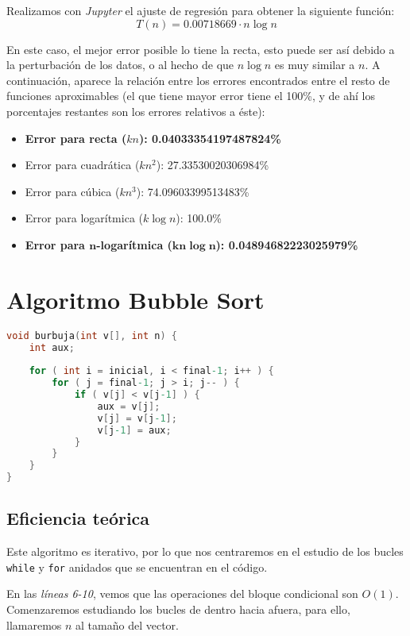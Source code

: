 \documentclass[10pt, a4paper]{article}
\theoremstyle{theorem-style}
\theoremstyle{theorem-style}
\theoremstyle{definition-style}
\theoremstyle{remark-style}
\theoremstyle{example-style}
\theoremstyle{definition-style}
\theoremstyle{remark-style}
\begin{document}
Realizamos con \emph{Jupyter} el ajuste de regresión para obtener la siguiente función:
$$T(n)=0.00718669\cdot n \log n$$

En este caso, el mejor error posible lo tiene la recta, esto puede ser así debido a la perturbación de los datos, o al hecho de que $n\log n$ es muy similar a $n$. A continuación, aparece la relación entre los errores encontrados entre el resto de funciones aproximables (el que tiene mayor error tiene el 100\%, y de ahí los porcentajes restantes son los errores relativos a éste):

\begin{itemize}
	\item \textbf{Error para recta ($kn$): 0.04033354197487824\%}
	\item Error para cuadrática ($kn^2$): 27.33530020306984\%
	\item Error para cúbica ($kn^3$): 74.09603399513483\%
	\item Error para logarítmica ($k\log n$): 100.0\%
	\item \textbf{Error para $\boldsymbol{n}$-logarítmica ($\boldsymbol{kn\log n}$): 0.04894682223025979\%}
\end{itemize}

\pagebreak
\section{Algoritmo Bubble Sort}

\begin{lstlisting}[language=C]
void burbuja(int v[], int n) {
	int aux;
	
	for ( int i = inicial, i < final-1; i++ ) {
		for ( j = final-1; j > i; j-- ) {
			if ( v[j] < v[j-1] ) {
				aux = v[j];
				v[j] = v[j-1];
				v[j-1] = aux;
			}
		}
	}
}
\end{lstlisting}

\subsection{Eficiencia teórica}


Este algoritmo es iterativo, por lo que nos centraremos en el estudio de los bucles \texttt{while} y \texttt{for} anidados que se encuentran en el código.

En las \emph{líneas 6-10}, vemos que las operaciones del bloque condicional son $O(1)$. Comenzaremos estudiando los bucles de dentro hacia afuera, para ello, llamaremos $n$ al tamaño del vector.
\end{document}
